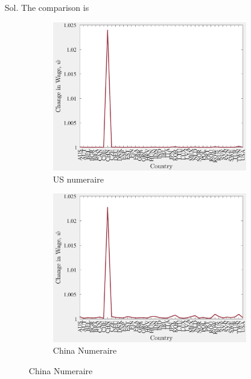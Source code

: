 \documentclass[12pt,oneside,reqno]{article}
\begin{document}
\begin{enumerate}[leftmargin=*, label=\textbf{(\roman*)}]
    \item[Sol.] The comparison is
    \begin{figure}[htb]
    \centering
    \caption{Wages}
    \label{hw2:fig2}
    \begin{subfigure}[b]{0.47\textwidth}
            \includegraphics[width=\textwidth]{Figures/w_hat.pdf}
            \caption{US numeraire}
        \end{subfigure}
        \begin{subfigure}[b]{0.47\textwidth}
            \includegraphics[width=\textwidth]{Figures/w_hat2.pdf}
            \caption{China Numeraire}
        \end{subfigure}
\end{figure}
\end{enumerate}
\clearpage
\end{document}
